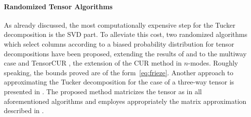 \paragraph{Randomized Tensor Algorithms}

As already discussed, the most computationally expensive step for the Tucker decomposition 
is the SVD part. To alleviate this cost, two randomized algorithms which select columns according to a biased probability 
distribution for tensor decompositions \cite{Drineas05arandomized} have been proposed, extending the results of \cite{1109681}and \cite{Drineas04fastmonte}
to the multiway case and TensorCUR \cite{DBLP:conf/kdd/MahoneyMD06}, the extension of the CUR method \cite{md-cmdid-2009} in $n$-modes.
Roughly speaking, the bounds proved are of the form~\ref{eq:frieze}.
Another approach to approximating the Tucker decomposition for the case of a three-way tensor is presented in \cite{1461977}.
The proposed method matricizes the tensor as in all aforementioned algorithms and employes appropriately the 
matrix approximation described in \cite{goreinov}.

